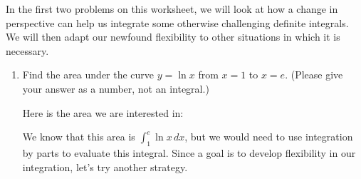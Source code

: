 \documentclass[main]{subfiles}
\begin{document}
In the first two problems on this worksheet, we will look at how
a change in perspective can help us integrate some otherwise
challenging definite integrals. We will then adapt our newfound
flexibility to other situations in which it is necessary.

\begin{enumerate}

\item 

  \begin{problem}[\vfill]
    Find the area under the curve $y = \ln x$ from $x = 1$ to $x = e$.
    (Please give your answer as a number, not an integral.)
  \end{problem}

  \begin{solution}
    Here is the area we are interested in:
    \begin{center}
    \end{center}
    We know that this area is $\displaystyle \int_1^e \ln x\,dx$, but
    we would need to use integration by parts to evaluate this integral. Since a goal is to develop flexibility in our integration, let's try another strategy.


\end{solution}
\end{enumerate}
\end{document}
